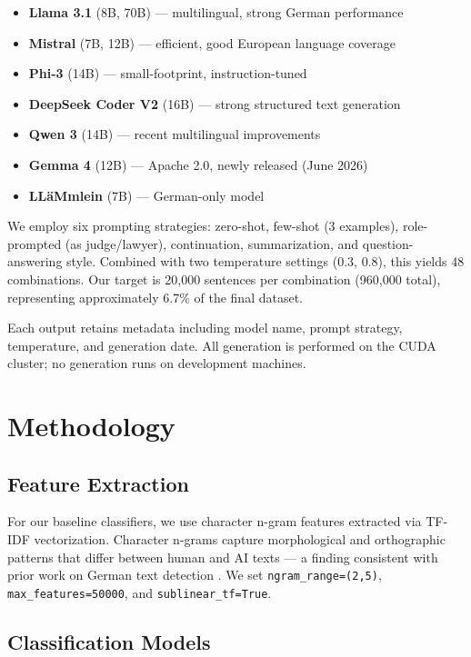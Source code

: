 \documentclass[11pt,a4paper]{article}
\begin{document}
\begin{itemize}
  \item \textbf{Llama 3.1} (8B, 70B) --- multilingual, strong German performance
  \item \textbf{Mistral} (7B, 12B) --- efficient, good European language coverage
  \item \textbf{Phi-3} (14B) --- small-footprint, instruction-tuned
  \item \textbf{DeepSeek Coder V2} (16B) --- strong structured text generation
  \item \textbf{Qwen 3} (14B) --- recent multilingual improvements
  \item \textbf{Gemma 4} (12B) --- Apache 2.0, newly released (June 2026)
  \item \textbf{LL\"{a}Mmlein} (7B) --- German-only model \cite{pfister2025llammlein}
\end{itemize}

We employ six prompting strategies: zero-shot, few-shot (3 examples), role-prompted (as judge/lawyer), continuation, summarization, and question-answering style. Combined with two temperature settings (0.3, 0.8), this yields 48 combinations. Our target is 20,000 sentences per combination (960,000 total), representing approximately 6.7\% of the final dataset.

Each output retains metadata including model name, prompt strategy, temperature, and generation date. All generation is performed on the CUDA cluster; no generation runs on development machines.

\section{Methodology}

\subsection{Feature Extraction}

For our baseline classifiers, we use character n-gram features extracted via TF-IDF vectorization. Character n-grams capture morphological and orthographic patterns that differ between human and AI texts --- a finding consistent with prior work on German text detection \cite{irrgang2024features}. We set {\tt ngram\_range=(2,5)}, {\tt max\_features=50000}, and {\tt sublinear\_tf=True}.

\subsection{Classification Models}
\end{document}
